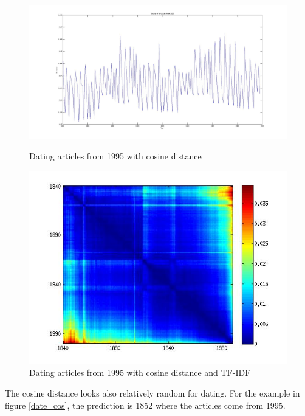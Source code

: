 \begin{figure}[H]
    \begin{minipage}[b]{0.48\linewidth}
        \includegraphics[scale=0.12]{Pictures/date_articles/cos/dating1995_corrected.jpg}
        \caption{Dating articles from 1995 with cosine distance}
        \label{date_cos}
    \end{minipage}\hfill
    \begin{minipage}[b]{0.5\linewidth}
        \includegraphics[scale=0.3]{Pictures/cos/cos_corrected.jpg}
        \caption{Dating articles from 1995 with cosine distance and TF-IDF}
        \label{date_cos_tfidf}
    \end{minipage}\hfill
\end{figure}
The cosine distance looks also relatively random for dating. For the example in figure \ref{date_cos}, the prediction is 1852 where the articles come from 1995.